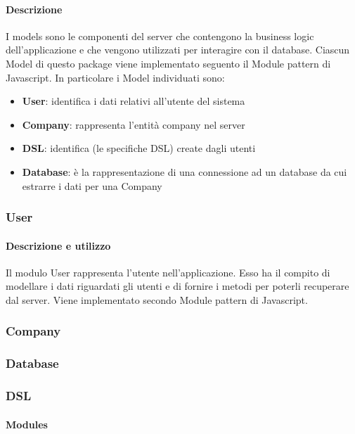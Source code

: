 \paragraph*{Descrizione} 
I models sono le componenti del server che contengono la business logic dell'applicazione e che vengono utilizzati per interagire con il database.
Ciascun Model di questo package viene implementato seguento il Module pattern di Javascript. %
In particolare i Model individuati sono:
\begin{itemize}
\item \textbf{User}: identifica i dati relativi all'utente del sistema
\item \textbf{Company}: rappresenta l'entità company nel server
\item \textbf{DSL}: identifica (le specifiche DSL) create dagli utenti
\item \textbf{Database}: è la rappresentazione di una connessione ad un database da cui estrarre i dati per una Company
\end{itemize}

\subsubsection{User}
\paragraph*{Descrizione e utilizzo}
Il modulo User rappresenta l'utente nell'applicazione. Esso ha il compito di modellare i dati riguardati gli utenti e di fornire i metodi per poterli recuperare dal server. Viene implementato secondo Module pattern di Javascript.

\subsubsection{Company}

\subsubsection{Database}

\subsubsection{DSL}


\paragraph*{Modules}

